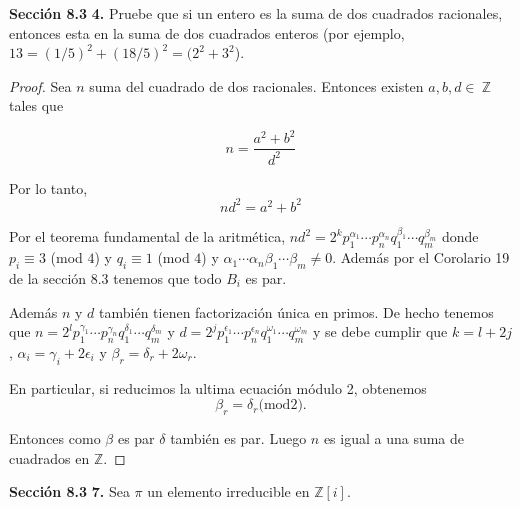 \documentclass[letter,twoside,12pt]{article}
\begin{document}
\newpage \textbf{Sección 8.3} \textbf{4.} Pruebe que si un entero es la suma de dos cuadrados racionales, entonces esta en la suma de dos cuadrados enteros (por ejemplo, $ 13 = (1/5)^2+(18/5)^2 = (2^2+3^2 $).
\begin{proof}
Sea $ n $ suma del cuadrado de dos racionales. Entonces existen $ a,b, d \in \ \mathbb{Z}$ tales que

\begin{equation}
n = \frac{a^2+b^2}{d^2} \nonumber
\end{equation}

Por lo tanto,
\begin{equation}
nd^2 = a^2+b^2 \nonumber
\end{equation}

Por el teorema fundamental de la aritmética, $ nd^2 = 2^{k}p_1^{\alpha_1}\cdots p_n^{\alpha_n}q_1^{\beta_1}\cdots q_m^{\beta_m}  $ donde $p_i \equiv 3$ (mod $ 4 $) y $q_i \equiv 1$ (mod $ 4 $) y $ \alpha_1\cdots\alpha_n\beta_1\cdots \beta_m \not = 0$. Además por el Corolario 19 de la sección 8.3 tenemos que todo $ B_i $ es par.

Además $n$ y $d$ también tienen factorización única en primos. De hecho tenemos que $n=2^{l}p_1^{\gamma_1}\cdots p_n^{\gamma_n}q_1^{\delta_1}\cdots q_m^{\delta_m}$ y $d=2^{j}p_1^{\epsilon_1}\cdots p_n^{\epsilon_n}q_1^{\omega_1}\cdots q_m^{\omega_m}$ y se debe cumplir que $k = l+2j$, $\alpha_i=\gamma_i+2\epsilon_i$ y $\beta_r=\delta_r+2\omega_r$.

En particular, si reducimos la ultima ecuación módulo 2, obtenemos
\begin{equation}
\beta_r=\delta_r \text{(mod} 2). \nonumber
\end{equation}

Entonces como $ \beta $ es par $\delta$ también es par. Luego $n$ es igual a una suma de cuadrados en $ \mathbb{Z} $.

\end{proof}


\newpage \textbf{Sección 8.3} \textbf{7.} Sea $ \pi $ un elemento irreducible en $ \mathbb{Z}[i] $.

 
\end{document}
